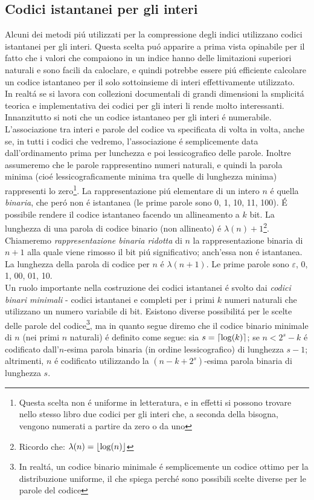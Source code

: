 \subsection{Codici istantanei per gli interi}
Alcuni dei metodi piú utilizzati per la compressione degli indici utilizzano codici istantanei per gli interi. Questa scelta puó apparire a prima vista opinabile per il fatto che i valori che compaiono in un indice hanno delle limitazioni superiori naturali e sono facili da caloclare, e quindi potrebbe essere piú efficiente calcolare un codice istantaneo per il solo sottoinsieme di interi effettivamente utilizzato.\\
In realtá se si lavora con collezioni documentali di grandi dimensioni la smplicitá teorica e implementativa dei codici per gli interi li rende molto interessanti.\\
Innanzitutto si noti che un codice istantaneo per gli interi é numerabile. L'associazione tra interi e parole del codice va specificata di volta in volta, anche se, in tutti i codici che vedremo, l'associazione é semplicemente data dall'ordinamento prima per lunchezza e poi lessicografico delle parole. Inoltre assumeremo che le parole rappresentino numeri naturali, e quindi la parola minima (cioé lessicograficamente minima tra quelle di lunghezza minima) rappresenti lo zero\footnote{Questa scelta non é uniforme in letteratura, e in effetti si possono trovare nello stesso libro due codici per gli interi che, a seconda della bisogna, vengono numerati a partire da zero o da uno}.
La rappresentazione piú elementare di un intero $n$ é quella \textit{binaria}, che peró non é istantanea (le prime parole sono 0, 1, 10, 11, 100). É possibile rendere il codice istantaneo facendo un allineamento a $k$ bit. La lunghezza di una parola di codice binario (non allineato) é $\lambda(n) + 1$\footnote{Ricordo che: $\lambda(n) = \left\lfloor \log(n) \right\rfloor$}.\\
Chiameremo \textit{rappresentazione binaria ridotta} di $n$ la rappresentazione binaria di $n + 1$ alla quale viene rimosso il bit piú significativo; anch'essa non é istantanea. La lunghezza della parola di codice per $n$ é $\lambda(n + 1)$. Le prime parole sono $\varepsilon$, 0, 1, 00, 01, 10.\\
Un ruolo importante nella costruzione dei codici istantanei é svolto dai \textit{codici binari minimali} - codici istantanei e completi per i primi $k$ numeri naturali che utilizzano un numero variabile di bit. Esistono diverse possibilitá per le scelte delle parole del codice\footnote{In realtá, un codice binario minimale é semplicemente un codice ottimo per la distribuzione uniforme, il che spiega perché sono possibili scelte diverse per le parole del codice}, ma in quanto segue diremo che il codice binario minimale di $n$ (nei primi $n$ naturali) é definito come segue: sia $s = \left\lceil \log(k) \right\rceil$; se $n < 2^s -k$ é codificato dall'$n$-esima parola binaria (in ordine lessicografico) di lunghezza $s - 1$; altrimenti, $n$ é codificato utilizzando la $(n - k + 2^s)$-esima parola binaria di lunghezza $s$.\\

